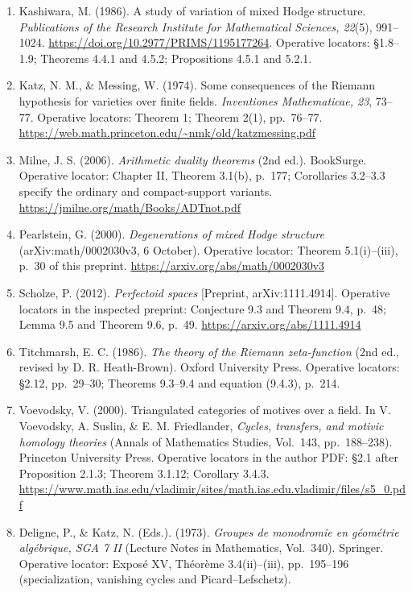 \documentclass[11pt,a4paper]{article}
\theoremstyle{definition}\newtheorem{definition}[theorem]{Definition}
\theoremstyle{remark}\newtheorem{remark}[theorem]{Remark}
\begin{document}
\begin{enumerate}[leftmargin=0pt,labelsep=0pt,label={}]
cycles. In \emph{Algebraic geometry, Bombay 1968} (pp.~193--199).
Oxford University Press. Operative locators: \S2, p.~195;
\S3, pp.~195--197; \S4 and Remarks 2--4, pp.~197--198.
\url{https://download.uni-mainz.de/mathematik/Algebraische%20Geometrie/Lehre/WS23.Padische.1968.Grothendieck.StandardConjs.pdf}
\item Kashiwara, M. (1986). A study of variation of mixed Hodge
structure. \emph{Publications of the Research Institute for Mathematical
Sciences, 22}(5), 991--1024.
\url{https://doi.org/10.2977/PRIMS/1195177264}.
Operative locators: \S1.8--1.9; Theorems 4.4.1 and 4.5.2;
Propositions 4.5.1 and 5.2.1.
\item Katz, N. M., \& Messing, W. (1974). Some consequences of the
Riemann hypothesis for varieties over finite fields.
\emph{Inventiones Mathematicae, 23}, 73--77.
Operative locators: Theorem 1; Theorem 2(1), pp.~76--77.
\url{https://web.math.princeton.edu/~nmk/old/katzmessing.pdf}
\item Milne, J. S. (2006). \emph{Arithmetic duality theorems} (2nd ed.).
BookSurge. Operative locator: Chapter II, Theorem 3.1(b), p.~177;
Corollaries 3.2--3.3 specify the ordinary and compact-support variants.
\url{https://jmilne.org/math/Books/ADTnot.pdf}
\item Pearlstein, G. (2000). \emph{Degenerations of mixed Hodge structure}
(arXiv:math/0002030v3, 6 October). Operative locator: Theorem 5.1(i)--(iii),
p.~30 of this preprint. \url{https://arxiv.org/abs/math/0002030v3}
\item Scholze, P. (2012). \emph{Perfectoid spaces}
[Preprint, arXiv:1111.4914]. Operative locators in the inspected
preprint: Conjecture 9.3 and Theorem 9.4, p.~48;
Lemma 9.5 and Theorem 9.6, p.~49.
\url{https://arxiv.org/abs/1111.4914}
\item Titchmarsh, E. C. (1986). \emph{The theory of the Riemann
zeta-function} (2nd ed., revised by D. R. Heath-Brown).
Oxford University Press. Operative locators: \S2.12,
pp.~29--30; Theorems 9.3--9.4 and equation (9.4.3), p.~214.
\item Voevodsky, V. (2000). Triangulated categories of motives
over a field. In V. Voevodsky, A. Suslin, \& E. M. Friedlander,
\emph{Cycles, transfers, and motivic homology theories}
(Annals of Mathematics Studies, Vol.~143, pp.~188--238).
Princeton University Press. Operative locators in the author PDF:
\S2.1 after Proposition 2.1.3; Theorem 3.1.12; Corollary 3.4.3.
\url{https://www.math.ias.edu/vladimir/sites/math.ias.edu.vladimir/files/s5_0.pdf}
\item Deligne, P., \& Katz, N. (Eds.). (1973).
\emph{Groupes de monodromie en g\'eom\'etrie alg\'ebrique,
SGA 7 II} (Lecture Notes in Mathematics, Vol.~340). Springer.
Operative locator: Expos\'e XV, Th\'eor\`eme 3.4(ii)--(iii),
pp.~195--196 (specialization, vanishing cycles and Picard--Lefschetz).
\end{enumerate}
\end{document}
